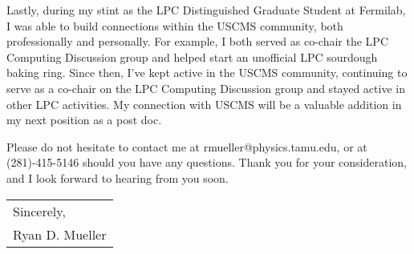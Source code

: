 \documentclass[11pt]{article}
\begin{document}



Lastly, during my stint as the LPC Distinguished Graduate Student at Fermilab, I was able to build connections within the USCMS community, both professionally and personally. For example, I both served as co-chair the LPC Computing Discussion group and helped start an unofficial LPC sourdough baking ring. Since then, I've kept active in the USCMS community, continuing to serve as a co-chair on the LPC Computing Discussion group and stayed active in other LPC activities. My connection with USCMS will be a valuable addition in my next position as a post doc. 





 Please do not hesitate to contact me at rmueller@physics.tamu.edu, or at (281)-415-5146 should you have any questions. Thank you for your consideration, and I look forward to hearing from you soon.


\bigskip

\begin{tabular}{@{}l@{}}
Sincerely, \\
  [.4em]
  Ryan D. Mueller
\end{tabular}
\end{document}
